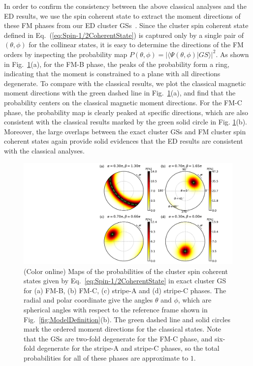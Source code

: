 \documentclass[aps,prb,reprint,amsfonts,amsmath,amssymb,showpacs,groupedaddress,superscriptaddress]{revtex4-1}
\begin{document}
In order to confirm the consistency between the above classical analyses and the ED results, we use the spin coherent state to extract the moment directions of these FM phases from our ED cluster GSs~\cite{PhysRevB.94.064435}. Since the cluster spin coherent state defined in Eq.~(\ref{eq:Spin-1/2CoherentState}) is captured only by a single pair of $(\theta, \phi)$ for the collinear states, it is easy to determine the directions of the FM orders by inspecting the probability map $P(\theta, \phi) = | \langle \Psi (\theta, \phi) | GS \rangle |^2$. As shown in Fig.~\ref{fig:Proabilities}(a), for the FM-B phase, the peaks of the probability form a ring, indicating that the moment is constrained to a plane with all directions degenerate. To compare with the classical results, we plot the classical magnetic moment directions with the green dashed line in Fig.~\ref{fig:Proabilities}(a), and find that the probability centers on the classical magnetic moment directions. For the FM-C phase, the probability map is clearly peaked at specific directions, which are also consistent with the classical results marked by the green solid circle in Fig. \ref{fig:Proabilities}(b). Moreover, the large overlaps between the exact cluster GSs and FM cluster spin coherent states again provide solid evidences that the ED results are consistent with the classical analyses.
\begin{figure}
    \centering
    \includegraphics[width=\columnwidth]{fig/Probabilities.pdf}
    \caption{\label{fig:Proabilities}(Color online) Maps of the probabilities of the cluster spin coherent states given by Eq.~\eqref{eq:Spin-1/2CoherentState} in exact cluster GS for (a) FM-B, (b) FM-C, (c) stripe-A and (d) stripe-C phases. The radial and polar coordinate give the angles $\theta$ and $\phi$, which are spherical angles with respect to the reference frame shown in Fig.~\ref{fig:ModelDefinition}(b). The green dashed line and solid circles mark the ordered moment directions for the classical states. Note that the GSs are two-fold degenerate for the FM-C phase, and six-fold degenerate for the stripe-A and stripe-C phases, so the total probabilities for all of these phases are approximate to $1$. }
\end{figure}
\end{document}
